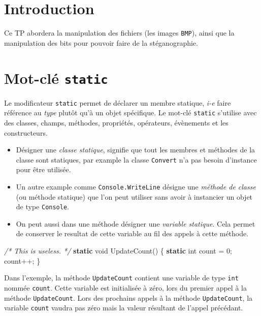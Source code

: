 \documentclass[11pt, a4paper]{article}
\newenvironment{Shaded}{}{}
\newcommand{\KeywordTok}[1]{\textcolor[rgb]{0.00,0.44,0.13}{\textbf{{#1}}}}
\newcommand{\DataTypeTok}[1]{\textcolor[rgb]{0.56,0.13,0.00}{{#1}}}
\newcommand{\DecValTok}[1]{\textcolor[rgb]{0.25,0.63,0.44}{{#1}}}
\newcommand{\CommentTok}[1]{\textcolor[rgb]{0.38,0.63,0.69}{\textit{{#1}}}}
\newcommand{\FunctionTok}[1]{\textcolor[rgb]{0.02,0.16,0.49}{{#1}}}
\newcommand{\NormalTok}[1]{{#1}}
\begin{document}
\section{Introduction}\label{introduction}

Ce TP abordera la manipulation des fichiers (les images \texttt{BMP}),
ainsi que la manipulation des bits pour pouvoir faire de la
stéganographie.
\section{Mot-clé \texttt{static}}\label{mot-cluxe9-static}

Le modificateur \texttt{static} permet de déclarer un membre statique,
\emph{i-e} faire référence au \emph{type} plutôt qu'à un objet
spécifique. Le mot-clé \texttt{static} s'utilise avec des classes,
champs, méthodes, propriétés, opérateurs, évènements et les
constructeurs.\newline

\begin{itemize}
\itemsep1pt\parskip0pt
\item
  Désigner une \emph{classe statique}, signifie que tout les membres et
  méthodes de la classe sont statiques, par example la classe
  \texttt{Convert} n'a pas besoin d'instance pour être utilisée.
\item
  Un autre example comme \texttt{Console.WriteLine} désigne une
  \emph{méthode de classe} (ou méthode statique) que l'on peut utiliser
  sans avoir à instancier un objet de type \texttt{Console}.
\item
  On peut aussi dans une méthode désigner une \emph{variable statique}.
  Cela permet de conserver le resultat de cette variable au fil des
  appels à cette méthode.
\end{itemize}

\begin{Shaded}
\begin{Highlighting}[]
\CommentTok{/* This is useless. */}
\KeywordTok{static} \DataTypeTok{void} \FunctionTok{UpdateCount}\NormalTok{()}
\NormalTok{\{}
    \KeywordTok{static} \DataTypeTok{int} \NormalTok{count = }\DecValTok{0}\NormalTok{;}
    \NormalTok{count++;}
\NormalTok{\}}
\end{Highlighting}
\end{Shaded}

Dans l'exemple, la méthode \texttt{UpdateCount} contient une variable de
type \texttt{int} nommée \texttt{count}. Cette variable est initialisée
à zéro, lors du premier appel à la méthode \texttt{UpdateCount}. Lors
des prochains appels à la méthode \texttt{UpdateCount}, la variable
\texttt{count} vaudra pas zéro mais la valeur résultant de l'appel
précédant.
\end{document}
